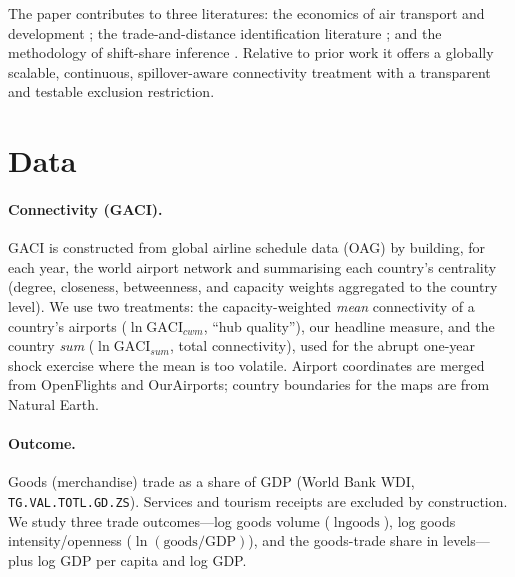 \documentclass[review,3p,times]{elsarticle}
\begin{document}
The paper contributes to three literatures: the economics of air transport and
development \citep{Brueckner_2003,Campante_2017}; the trade-and-distance
identification literature \citep{Frankel_1999,Feyrer_2019}; and the methodology
of shift-share inference \citep{GoldsmithPinkham_2020,Adao_2019,Borusyak_2022}.
Relative to prior work it offers a globally scalable, continuous,
spillover-aware connectivity treatment with a transparent and testable
exclusion restriction.

\section{Data}
\paragraph{Connectivity (GACI).} GACI is constructed from global airline
schedule data (OAG) by building, for each year, the world airport network and
summarising each country's centrality (degree, closeness, betweenness, and
capacity weights aggregated to the country level). We use two treatments: the
capacity-weighted \emph{mean} connectivity of a country's airports
($\ln\text{GACI}_{cwm}$, ``hub quality''), our headline measure, and the
country \emph{sum} ($\ln\text{GACI}_{sum}$, total connectivity), used for the
abrupt one-year shock exercise where the mean is too volatile. Airport
coordinates are merged from OpenFlights and OurAirports; country boundaries for
the maps are from Natural Earth.

\paragraph{Outcome.} Goods (merchandise) trade as a share of GDP (World Bank
WDI, \texttt{TG.VAL.TOTL.GD.ZS}). Services and tourism receipts are excluded by
construction. We study three trade outcomes---log goods volume
($\ln\text{goods}$), log goods intensity/openness ($\ln(\text{goods}/\text{GDP})$),
and the goods-trade share in levels---plus log GDP per capita and log GDP.
\end{document}

